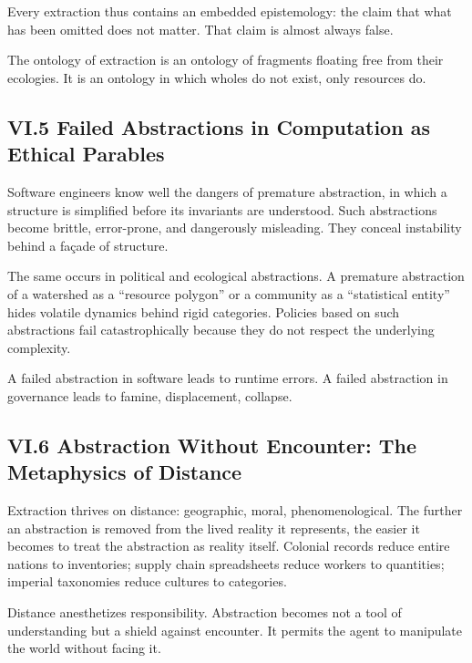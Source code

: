 \documentclass[11pt,letterpaper]{article}
\begin{document}
Every extraction thus contains an embedded epistemology: the claim that what has been omitted does not matter. That claim is almost always false.

The ontology of extraction is an ontology of fragments floating free from their ecologies. It is an ontology in which wholes do not exist, only resources do.

\subsection{VI.5 Failed Abstractions in Computation as Ethical Parables}

Software engineers know well the dangers of premature abstraction, in which a structure is simplified before its invariants are understood. Such abstractions become brittle, error-prone, and dangerously misleading. They conceal instability behind a façade of structure.

The same occurs in political and ecological abstractions. A premature abstraction of a watershed as a ``resource polygon'' or a community as a ``statistical entity'' hides volatile dynamics behind rigid categories. Policies based on such abstractions fail catastrophically because they do not respect the underlying complexity.

A failed abstraction in software leads to runtime errors. A failed abstraction in governance leads to famine, displacement, collapse.

\subsection{VI.6 Abstraction Without Encounter: The Metaphysics of Distance}

Extraction thrives on distance: geographic, moral, phenomenological. The further an abstraction is removed from the lived reality it represents, the easier it becomes to treat the abstraction as reality itself. Colonial records reduce entire nations to inventories; supply chain spreadsheets reduce workers to quantities; imperial taxonomies reduce cultures to categories.

Distance anesthetizes responsibility. Abstraction becomes not a tool of understanding but a shield against encounter. It permits the agent to manipulate the world without facing it.
\end{document}
